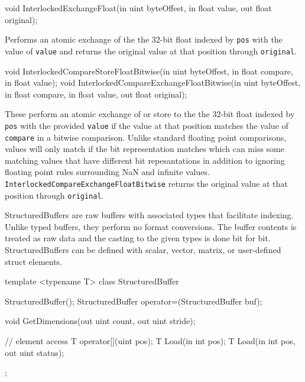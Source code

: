 \begin{HLSL}
   void InterlockedExchangeFloat(in uint byteOffest, in float value,
                                  out float original);
\end{HLSL}

Performs an atomic exchange of the the 32-bit float indexed by \texttt{pos} with
the value of \texttt{value} and returns the original value at that position through \texttt{original}.

\begin{HLSL}
  void InterlockedCompareStoreFloatBitwise(in uint byteOffest, in float compare,
                                            in float value);
  void InterlockedCompareExchangeFloatBitwise(in uint byteOffest,
                                               in float compare,
                                               in float value,
                                               out float original);
\end{HLSL}

These perform an atomic exchange of or store to the the 32-bit float indexed by \texttt{pos}
with the provided \texttt{value} if the value at that position matches the value of \texttt{compare}
in a bitwise comparison.
Unlike standard floating point comparisons, values will only match if the bit representation matches
which can miss some matching values that have different bit repesantations in addition to ignoring
floating point rules surrounding NaN and infinite values.
\texttt{InterlockedCompareExchangeFloatBitwise} returns the original value at that position through \texttt{original}.


StructuredBuffers are raw buffers with associated types that facilitate indexing.
Unlike typed buffers, they perform no format conversions.
The buffer contents is treated as raw data and the casting to the given types is done bit for bit.
StructuredBuffers can be defined with scalar, vector, matrix, or user-defined struct elements.


\begin{HLSL}
template <typename T>
 class StructuredBuffer {
   StructuredBuffer();
   StructuredBuffer operator=(StructuredBuffer buf);

   void GetDimensions(out uint count, out uint stride);

   // element access
   T operator[](uint pos);
   T Load(in int pos);
   T Load(in int pos, out uint status);
};
\end{HLSL}

